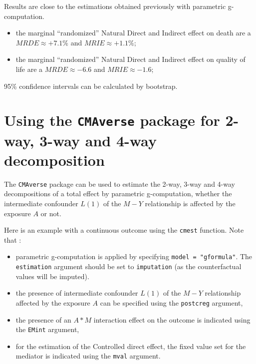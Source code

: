 \documentclass[
]{book}
\providecommand{\tightlist}{%
  \setlength{\itemsep}{0pt}\setlength{\parskip}{0pt}}
\begin{document}
Results are close to the estimations obtained previously with parametric g-computation.

\begin{itemize}
\tightlist
\item
  the marginal ``randomized'' Natural Direct and Indirect effect on death are a \(MRDE \approx +7.1\%\) and \(MRIE \approx +1.1\%\);
\item
  the marginal ``randomized'' Natural Direct and Indirect effect on quality of life are a \(MRDE \approx -6.6\) and \(MRIE \approx -1.6\);
\end{itemize}

95\% confidence intervals can be calculated by bootstrap.

\section{\texorpdfstring{Using the \texttt{CMAverse} package for 2-way, 3-way and 4-way decomposition}{Using the CMAverse package for 2-way, 3-way and 4-way decomposition}}\label{using-the-cmaverse-package-for-2-way-3-way-and-4-way-decomposition}

The \texttt{CMAverse} package can be used to estimate the 2-way, 3-way and 4-way decompositions of a total effect by parametric g-computation, whether the intermediate confounder \(L(1)\) of the \(M-Y\) relationship is affected by the exposure \(A\) or not.

Here is an example with a continuous outcome using the \texttt{cmest} function. Note that :

\begin{itemize}
\tightlist
\item
  parametric g-computation is applied by specifying \texttt{model\ =\ "gformula"}. The \texttt{estimation} argument should be set to \texttt{imputation} (as the counterfactual values will be imputed).
\item
  the presence of intermediate confounder \(L(1)\) of the \(M-Y\) relationship affected by the exposure \(A\) can be specified using the \texttt{postcreg} argument,
\item
  the presence of an \(A \ast M\) interaction effect on the outcome is indicated using the \texttt{EMint} argument,
\item
  for the estimation of the Controlled direct effect, the fixed value set for the mediator is indicated using the \texttt{mval} argument.
\end{itemize}
\end{document}

